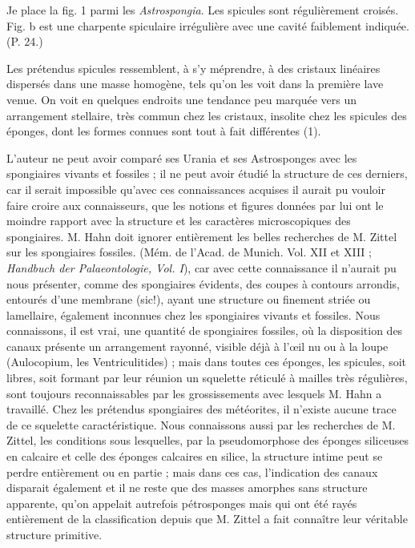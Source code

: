 \documentclass[a4paper, 12pt, oneside, french]{book}
\begin{document}
\og Je place la fig. 1 parmi les \emph{Astrospongia}. Les spicules sont régulièrement croisés. Fig. b est une charpente spiculaire irrégulière avec une cavité faiblement indiquée. \fg (P. 24.)

Les prétendus spicules ressemblent, à s'y méprendre, à des cristaux linéaires dispersés dans une masse homogène, tels qu'on les voit dans la première lave venue. On voit en quelques endroits une tendance peu marquée vers un arrangement stellaire, très commun chez les cristaux, insolite chez les spicules des éponges, dont les formes connues sont tout à fait différentes (1).

L'auteur ne peut avoir comparé ses Urania et ses Astrosponges avec les spongiaires vivants et fossiles ; il ne peut avoir étudié la structure de ces derniers, car il serait impossible qu'avec ces connaissances acquises il aurait pu vouloir faire croire aux connaisseurs, que les notions et figures données par lui ont le moindre rapport avec la structure et les caractères microscopiques des spongiaires. M. Hahn doit ignorer entièrement les belles recherches de M. Zittel sur les spongiaires fossiles. (Mém. de l'Acad. de Munich. Vol. XII et XIII ; \emph{Handbuch der Palaeontologie, Vol. I}), car avec cette connaissance il n'aurait pu nous présenter, comme des spongiaires évidents, des coupes à contours arrondis, entourés d'une membrane (sic!), ayant une structure ou finement striée ou lamellaire, également inconnues chez les spongiaires vivants et fossiles. Nous connaissons, il est vrai, une quantité de spongiaires fossiles, où la disposition des canaux présente un arrangement rayonné, visible déjà à l'œil nu ou à la loupe (Aulocopium, les Ventriculitides) ; mais dans toutes ces éponges, les spicules, soit libres, soit formant par leur réunion un squelette réticulé à mailles très régulières, sont toujours reconnaissables par les grossissements avec lesquels M. Hahn a travaillé. Chez les prétendus spongiaires des météorites, il n'existe aucune trace de ce squelette caractéristique. Nous connaissons aussi par les recherches de M. Zittel, les conditions sous lesquelles, par la pseudomorphose des éponges siliceuses en calcaire et celle des éponges calcaires en silice, la structure intime peut se perdre entièrement ou en partie ; mais dans ces cas, l'indication des canaux disparait également et il ne reste que des masses amorphes sans structure apparente, qu'on appelait autrefois \og pétrosponges \fg mais qui ont été rayés entièrement de la classification depuis que M. Zittel a fait connaître leur véritable structure primitive.
\end{document}
